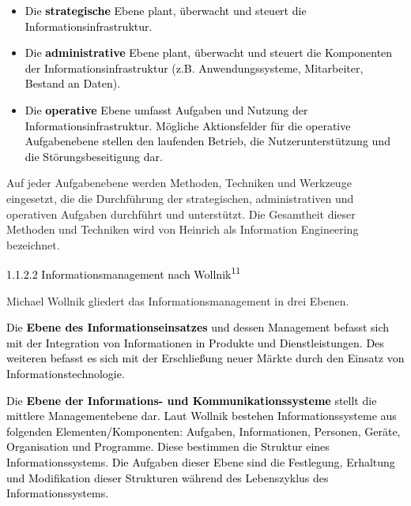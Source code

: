 \documentclass[a4paper]{article}
\newcommand\liststyleLi{%
\renewcommand\labelitemi{•}
\renewcommand\labelitemii{◦}
\renewcommand\labelitemiii{${\blacksquare}$}
\renewcommand\labelitemiv{•}
}
\begin{document}
\bigskip

\liststyleLi
\begin{itemize}
\item {\sffamily
\textcolor{black}{Die }\textbf{\textcolor{black}{strategische}}\textcolor{black}{ Ebene plant, überwacht und steuert die
Informationsinfrastruktur.}}
\item {\sffamily
\textcolor{black}{Die }\textbf{\textcolor{black}{administrative}}\textcolor{black}{ Ebene plant, überwacht und steuert
die Komponenten der Informationsinfrastruktur (z.B. Anwendungssysteme, Mitarbeiter, Bestand an Daten).}}
\item {\sffamily
\textcolor{black}{Die }\textbf{\textcolor{black}{operative}}\textcolor{black}{ Ebene umfasst Aufgaben und Nutzung der
Informationsinfrastruktur. Mögliche Aktionsfelder für die operative Aufgabenebene stellen den laufenden Betrieb, die
Nutzerunterstützung und die Störungsbeseitigung dar.}}


\bigskip
\end{itemize}
{\sffamily\color{black}
Auf jeder Aufgabenebene werden Methoden, Techniken und Werkzeuge eingesetzt, die die Durchführung der strategischen,
administrativen und operativen Aufgaben durchführt und unterstützt. Die Gesamtheit dieser Methoden und Techniken wird
von Heinrich als Information Engineering bezeichnet.}


\bigskip

{\sffamily
\newline
\textcolor{black}{1.1.2.2 Informationsmanagement nach Wollnik}\textcolor{black}{\textsuperscript{11}}}


\bigskip

{\sffamily\color{black}
Michael Wollnik gliedert das Informationsmanagement in drei Ebenen.\newline
}

{\sffamily
\textcolor{black}{Die }\textbf{\textcolor{black}{Ebene des Informationseinsatzes}}\textcolor{black}{ und dessen
Management befasst sich mit der Integration von Informationen in Produkte und Dienstleistungen. Des weiteren befasst es
sich mit der Erschließung neuer Märkte durch den Einsatz von Informationstechnologie.\newline
}}

{\sffamily
\textcolor{black}{Die }\textbf{\textcolor{black}{Ebene der Informations- und Kommunikationssysteme}}\textcolor{black}{
stellt die mittlere Managementebene dar. Laut Wollnik bestehen Informationssysteme aus folgenden Elementen/Komponenten:
Aufgaben, Informationen, Personen, Geräte, Organisation und Programme. Diese bestimmen die Struktur eines
Informationssystems. Die Aufgaben dieser Ebene sind die Festlegung, Erhaltung }\textcolor{black}{und Modifikation
dieser Strukturen während des Lebenszyklus des Informationssystems.}}
\end{document}
